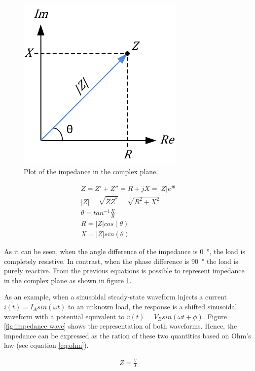 \begin{figure}[!htpb]
	\centering
	\includegraphics{figure_2}    
	\caption[Complex representation of impedance]{Plot of the impedance in the complex plane.}
	\label{fig:complex impedance}
\end{figure}

\begin{gather}
	\label{eq:Z magnitude}
	Z = Z' + Z'' = R + jX = \lvert Z \rvert e^{j\theta}\\
	|Z| = \sqrt{Z Z^{*}} = \sqrt{R^2 + X^2} \\
	\theta = tan^{-1}\frac{X}{R} \\
	\label{eq:resistance}
	R = \lvert Z \rvert cos(\theta) \\
	\label{eq:reactance}
	X = \lvert Z \rvert sin(\theta)
\end{gather}

As it can be seen, when the angle difference of the impedance is \SI{0}{\degree}, the load is completely resistive. In contrast, when the phase difference is \SI{90}{\degree} the load is purely reactive. From the previous equations is possible to represent impedance in the complex plane as shown in figure \ref{fig:complex impedance}.

As an example, when a sinusoidal steady-state waveform injects a current $i(t) = I_A sin(\omega t)$ to an unknown load, the response is a shifted sinusoidal waveform with a potential equivalent to $v(t) = V_B sin(\omega t + \phi)$. Figure \ref{fig:impedance wave} shows the representation of both waveforms. Hence, the impedance can be expressed as the ration of these two quantities based on Ohm's law (see equation \ref{eq:ohm}).

\begin{align}
	\label{eq:ohm}
	Z = \frac{V}{I}
\end{align}


